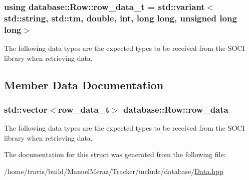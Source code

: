 \subsubsection[{\texorpdfstring{row\+\_\+data\+\_\+t}{row_data_t}}]{\setlength{\rightskip}{0pt plus 5cm}using {\bf database\+::\+Row\+::row\+\_\+data\+\_\+t} =  std\+::variant$<$std\+::string, std\+::tm, double, int, long long, unsigned long long$>$}\hypertarget{structdatabase_1_1_row_a29c16186778c974af723db03751f3aa3}{}\label{structdatabase_1_1_row_a29c16186778c974af723db03751f3aa3}


The following data types are the expected types to be received from the S\+O\+CI library when retrieving data. 



\subsection{Member Data Documentation}
\subsubsection[{\texorpdfstring{row\+\_\+data}{row_data}}]{\setlength{\rightskip}{0pt plus 5cm}std\+::vector$<${\bf row\+\_\+data\+\_\+t}$>$ database\+::\+Row\+::row\+\_\+data}\hypertarget{structdatabase_1_1_row_ae49f50c19ad3f4ec793c63b18623f1d7}{}\label{structdatabase_1_1_row_ae49f50c19ad3f4ec793c63b18623f1d7}


The following data types are the expected types to be received from the S\+O\+CI library when retrieving data. 



The documentation for this struct was generated from the following file\+:\begin{DoxyCompactItemize}
\item 
/home/travis/build/\+Manuel\+Meraz/\+Tracker/include/database/\hyperlink{_data_8hpp}{Data.\+hpp}\end{DoxyCompactItemize}
